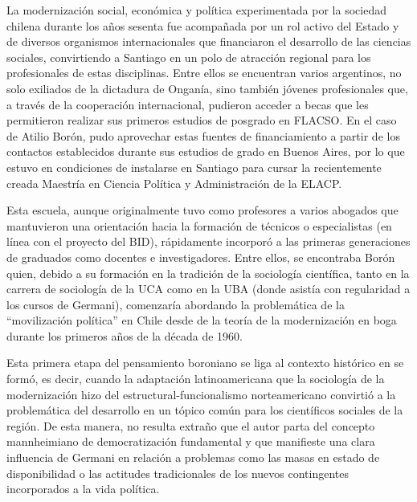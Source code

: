 La modernización social, económica y política experimentada por la sociedad chilena durante los años sesenta fue acompañada por un rol activo del Estado y de diversos organismos internacionales que financiaron el desarrollo de las ciencias sociales, convirtiendo a Santiago en un polo de atracción regional para los profesionales de estas disciplinas. Entre ellos se encuentran varios argentinos, no solo exiliados de la dictadura de Onganía, sino también jóvenes profesionales que, a través de la cooperación internacional, pudieron acceder a becas que les permitieron realizar sus primeros estudios de posgrado en FLACSO. En el caso de Atilio Borón, pudo aprovechar estas fuentes de financiamiento a partir de los contactos establecidos durante sus estudios de grado en Buenos Aires, por lo que estuvo en condiciones de instalarse en Santiago para cursar la recientemente creada Maestría en Ciencia Política y Administración de la ELACP.

Esta escuela, aunque originalmente tuvo como profesores a varios abogados que mantuvieron una orientación hacia la formación de técnicos o especialistas (en línea con el proyecto del BID), rápidamente incorporó a las primeras generaciones de graduados como docentes e investigadores. Entre ellos, se encontraba Borón quien, debido a su formación en la tradición de la sociología científica, tanto en la carrera de sociología de la UCA como en la UBA (donde asistía con regularidad a los cursos de Germani), comenzaría abordando la problemática de la \enquote{movilización política} en Chile desde de la teoría de la modernización en boga durante los primeros años de la década de 1960.

Esta primera etapa del pensamiento boroniano se liga al contexto histórico en se formó, es decir, cuando la adaptación latinoamericana que la sociología de la modernización hizo del estructural-funcionalismo norteamericano convirtió a la problemática del desarrollo en un tópico común para los científicos sociales de la región. De esta manera, no resulta extraño que el autor parta del concepto mannheimiano de democratización fundamental y que manifieste una clara influencia de Germani en relación a problemas como las masas en estado de disponibilidad o las actitudes tradicionales de los nuevos contingentes incorporados a la vida política.

